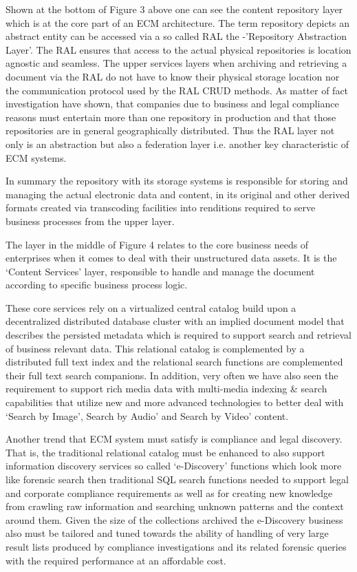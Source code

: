 Shown at the bottom of Figure 3 above one can see the content repository layer which is at the core part of an ECM architecture. The term repository depicts an abstract entity can be accessed via a so called RAL the -'Repository Abstraction Layer'. The RAL ensures that access to the actual physical repositories is location agnostic and seamless. The upper services layers when archiving and retrieving a document via the RAL do not have to know their physical storage location nor the communication protocol used by the RAL CRUD methods. 
As matter of fact investigation have shown, that companies due to business and legal compliance reasons must entertain more than one repository in production and that those repositories are in general geographically distributed. Thus the RAL layer not only is an abstraction but also a federation layer i.e. another key characteristic of ECM systems.  

In summary the repository with its storage systems is responsible for storing and managing the actual electronic data and content, in its original and other derived formats created via transcoding facilities into renditions required to serve business processes from the upper layer.  
 
The layer in the middle of Figure 4 relates to the core business needs of enterprises when it comes to deal with their unstructured data assets. It is the ‘Content Services’ layer, responsible to handle and manage the document according to specific business process logic.  
 
These core services rely on a virtualized central catalog build upon a decentralized distributed database cluster with an implied document model that describes the persisted metadata which is required to support search and retrieval of business relevant data.  This relational catalog is complemented by a distributed full text index and the relational search functions are complemented their full text search companions. In addition, very often we have also seen the requirement to support rich media data with multi-media indexing \& search capabilities that utilize new and more advanced technologies to better deal with ‘Search by Image’, Search by Audio’ and Search by Video’ content.  
 
Another trend that ECM system must satisfy is compliance and legal discovery. That is, the traditional relational catalog must be enhanced to also support information discovery services so called ‘e-Discovery’ functions which look more like forensic search then traditional SQL search functions needed to support legal and corporate compliance requirements as well as for creating new knowledge from crawling raw information and searching unknown patterns and the context around them. Given the size of the collections archived the e-Discovery business also must be tailored and tuned towards the ability of handling of very large result lists produced by compliance investigations and its related forensic queries with the required performance at an affordable cost.  
 
